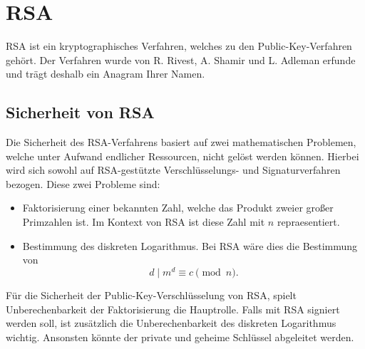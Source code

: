 \chapter{RSA}
\ac{RSA} ist ein kryptographisches Verfahren, welches zu den Public-Key-Verfahren gehört. Der Verfahren wurde von R. Rivest, A. Shamir und L. Adleman erfunde und trägt deshalb ein Anagram Ihrer Namen.

\section{Sicherheit von RSA}
Die Sicherheit des RSA-Verfahrens basiert auf zwei mathematischen Problemen, welche unter Aufwand endlicher Ressourcen, nicht gelöst werden können. Hierbei wird sich sowohl auf RSA-gestützte Verschlüsselungs- und Signaturverfahren bezogen.
Diese zwei Probleme sind:
\begin{itemize}
    \item Faktorisierung einer bekannten Zahl, welche das Produkt zweier großer Primzahlen ist. Im Kontext von RSA ist diese Zahl mit $n$ repraesentiert.
    \item Bestimmung des diskreten Logarithmus. Bei RSA wäre dies die Bestimmung von 
    \begin{equation}
        d \mid m^{d} \equiv c \pmod n .
    \end{equation}
\end{itemize}

Für die Sicherheit der Public-Key-Verschlüsselung von RSA, spielt Unberechenbarkeit der Faktorisierung die Hauptrolle. Falls mit RSA signiert werden soll, ist zusätzlich die Unberechenbarkeit des diskreten Logarithmus wichtig. Ansonsten könnte der private und geheime Schlüssel abgeleitet werden.



